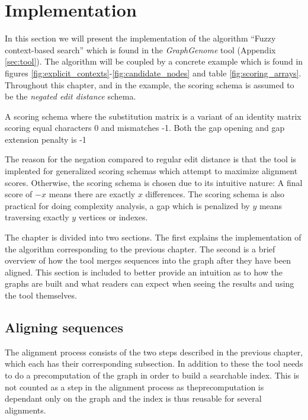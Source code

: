 \documentclass[thesis.tex]{subfiles}
\begin{document}
\chapter{Implementation}
In this section we will present the implementation of the algorithm ``Fuzzy context-based search'' which is found in the \textit{GraphGenome} tool (Appendix \ref{sec:tool}). The algorithm will be coupled by a concrete example which is found in figures \ref{fig:explicit_contexts}-\ref{fig:candidate_nodes} and table \ref{fig:scoring_arrays}. Throughout this chapter, and in the example, the scoring schema is assumed to be the \textit{negated edit distance} schema.
\begin{defn}
  A scoring schema where the substitution matrix is a variant of an identity matrix scoring equal characters 0 and mismatches -1. Both the gap opening and gap extension penalty is -1
\end{defn}
\noindent
The reason for the negation compared to regular edit distance is that the tool is implented for generalized scoring schemas which attempt to maximize alignment scores.  Otherwise, the scoring schema is chosen due to its intuitive nature: A final score of $-x$ means there are exactly $x$ differences. The scoring schema is also practical for doing complexity analysis, a gap which is penalized by $y$ means traversing exactly $y$ vertices or indexes.\\
\par\noindent
The chapter is divided into two sections. The first explains the implementation of the algorithm corresponding to the previous chapter. The second is a brief overview of how the tool merges sequences into the graph after they have been aligned. This section is included to better provide an intuition as to how the graphs are built and what readers can expect when seeing the results and using the tool themselves.
\section{Aligning sequences}
The alignment process consists of the two steps described in the previous chapter, which each has their corresponding subsection. In addition to these the tool needs to do a precomputation of the graph in order to build a searchable index. This is not counted as a step in the alignment process as theprecomputation is dependant only on the graph and the index is thus reusable for several alignments.
\end{document}
